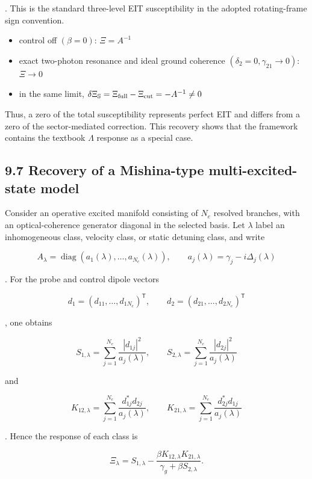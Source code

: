 \documentclass[
  10pt,
  a4paper,
]{article}
\providecommand{\tightlist}{%
  \setlength{\itemsep}{0pt}\setlength{\parskip}{0pt}}
\begin{document}
. This is the standard three-level EIT susceptibility in the adopted
rotating-frame sign convention.

\begin{itemize}
\tightlist
\item
  control off \((\beta=0)\): \(\Xi=A^{-1}\)
\item
  exact two-photon resonance and ideal ground coherence
  \((\delta_2=0,\gamma_{21}\to0)\): \(\Xi\to0\)
\item
  in the same limit,
  \(\delta\Xi_{\mathbb S}=\Xi_{\rm full}-\Xi_{\rm cut}=-A^{-1}\neq0\)
\end{itemize}

Thus, a zero of the total susceptibility represents perfect EIT and
differs from a zero of the sector-mediated correction. This recovery
shows that the framework contains the textbook \(\Lambda\) response as a
special case.

\subsection{9.7 Recovery of a Mishina-type multi-excited-state
model}\label{recovery-of-a-mishina-type-multi-excited-state-model}

Consider an operative excited manifold consisting of \(N_e\) resolved
branches, with an optical-coherence generator diagonal in the selected
basis. Let \(\lambda\) label an inhomogeneous class, velocity class, or
static detuning class, and write

\[
A_\lambda
=\operatorname{diag}
\left(a_1(\lambda),\ldots,a_{N_e}(\lambda)\right),
\qquad
a_j(\lambda)=\gamma_j-i\Delta_j(\lambda)
\]

. For the probe and control dipole vectors

\[
d_1=(d_{11},\ldots,d_{1N_e})^{\mathsf T},
\qquad
d_2=(d_{21},\ldots,d_{2N_e})^{\mathsf T}
\]

, one obtains

\[
\boxed{
S_{1,\lambda}
=\sum_{j=1}^{N_e}
\frac{|d_{1j}|^2}{a_j(\lambda)}
},
\qquad
\boxed{
S_{2,\lambda}
=\sum_{j=1}^{N_e}
\frac{|d_{2j}|^2}{a_j(\lambda)}
}
\]

and

\[
\boxed{
K_{12,\lambda}
=\sum_{j=1}^{N_e}
\frac{d_{1j}^*d_{2j}}{a_j(\lambda)}
},
\qquad
\boxed{
K_{21,\lambda}
=\sum_{j=1}^{N_e}
\frac{d_{2j}^*d_{1j}}{a_j(\lambda)}
}
\]

. Hence the response of each class is

\[
\boxed{
\Xi_\lambda
=S_{1,\lambda}
-
\frac{\beta K_{12,\lambda}K_{21,\lambda}}
{\gamma_g+\beta S_{2,\lambda}}
}.
\]
\end{document}
